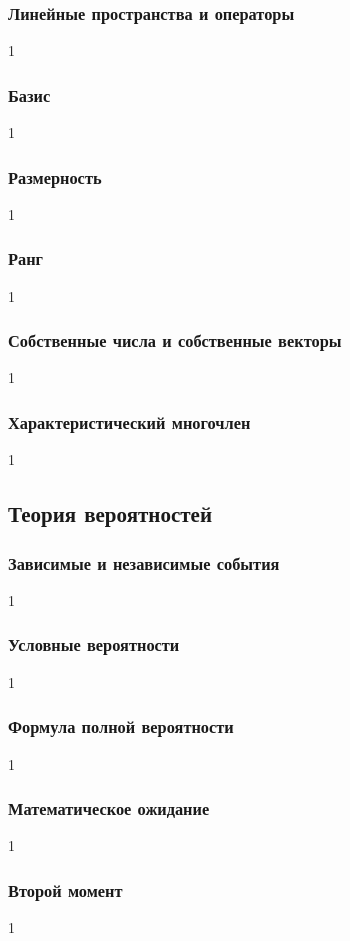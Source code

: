 \documentclass[14pt]{matmex-diploma}
\begin{document}
        \subsubsection*{Линейные пространства и операторы}
            1
        \subsubsection*{Базис}
            1
        \subsubsection*{Размерность}
            1
        \subsubsection*{Ранг}
            1
        \subsubsection*{Собственные числа и собственные векторы}
            1
        \subsubsection*{Характеристический многочлен}
            1
    
    \subsection{Теория вероятностей}
    
        \subsubsection*{Зависимые и независимые события}
            1
        \subsubsection*{Условные вероятности}
            1
        \subsubsection*{Формула полной вероятности}
            1
        \subsubsection*{Математическое ожидание}
            1
        \subsubsection*{Второй момент}
            1
\end{document}
